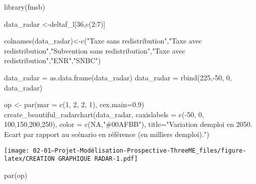 \documentclass[
]{article}
\newenvironment{Shaded}{\begin{snugshade}}{\end{snugshade}}
\newcommand{\AttributeTok}[1]{\textcolor[rgb]{0.77,0.63,0.00}{#1}}
\newcommand{\ConstantTok}[1]{\textcolor[rgb]{0.00,0.00,0.00}{#1}}
\newcommand{\DecValTok}[1]{\textcolor[rgb]{0.00,0.00,0.81}{#1}}
\newcommand{\FloatTok}[1]{\textcolor[rgb]{0.00,0.00,0.81}{#1}}
\newcommand{\FunctionTok}[1]{\textcolor[rgb]{0.00,0.00,0.00}{#1}}
\newcommand{\NormalTok}[1]{#1}
\newcommand{\OtherTok}[1]{\textcolor[rgb]{0.56,0.35,0.01}{#1}}
\newcommand{\SpecialCharTok}[1]{\textcolor[rgb]{0.00,0.00,0.00}{#1}}
\newcommand{\StringTok}[1]{\textcolor[rgb]{0.31,0.60,0.02}{#1}}
\begin{document}
\begin{Shaded}
\begin{Highlighting}[]
\FunctionTok{library}\NormalTok{(fmsb)}


\NormalTok{data\_radar }\OtherTok{\textless{}{-}}\NormalTok{deltaf\_l[}\DecValTok{36}\NormalTok{,}\FunctionTok{c}\NormalTok{(}\DecValTok{2}\SpecialCharTok{:}\DecValTok{7}\NormalTok{)]}



\FunctionTok{colnames}\NormalTok{(data\_radar)}\OtherTok{\textless{}{-}}\FunctionTok{c}\NormalTok{(}\StringTok{"Taxe sans redistribution"}\NormalTok{,}\StringTok{"Taxe avec redistribution"}\NormalTok{,}\StringTok{"Subvention sans redistribution"}\NormalTok{,}\StringTok{"Taxe avec redistribution"}\NormalTok{,}\StringTok{"ENR"}\NormalTok{,}\StringTok{"SNBC"}\NormalTok{)}

\NormalTok{data\_radar  }\OtherTok{=} \FunctionTok{as.data.frame}\NormalTok{(data\_radar)}
\NormalTok{data\_radar  }\OtherTok{=} \FunctionTok{rbind}\NormalTok{(}\DecValTok{225}\NormalTok{,}\SpecialCharTok{{-}}\DecValTok{50}\NormalTok{, }\DecValTok{0}\NormalTok{, data\_radar)}





\NormalTok{op }\OtherTok{\textless{}{-}} \FunctionTok{par}\NormalTok{(}\AttributeTok{mar =} \FunctionTok{c}\NormalTok{(}\DecValTok{1}\NormalTok{, }\DecValTok{2}\NormalTok{, }\DecValTok{2}\NormalTok{, }\DecValTok{1}\NormalTok{), }\AttributeTok{cex.main=}\FloatTok{0.9}\NormalTok{)}
\FunctionTok{create\_beautiful\_radarchart}\NormalTok{(data\_radar, }\AttributeTok{caxislabels =} \FunctionTok{c}\NormalTok{(}\SpecialCharTok{{-}}\DecValTok{50}\NormalTok{, }\DecValTok{0}\NormalTok{, }\DecValTok{100}\NormalTok{,}\DecValTok{150}\NormalTok{,}\DecValTok{200}\NormalTok{,}\DecValTok{250}\NormalTok{), }\AttributeTok{color =} \FunctionTok{c}\NormalTok{(}\ConstantTok{NA}\NormalTok{,}\StringTok{"\#00AFBB"}\NormalTok{), }\AttributeTok{title=}\StringTok{"Variation d\textquotesingle{}emploi en 2050. }
\StringTok{Ecart par rapport au scénario en référence (en milliers d\textquotesingle{}emploi)."}\NormalTok{)}
\end{Highlighting}
\end{Shaded}

\texttt{[image: 02-01---Projet-Modélisation-Prospective-ThreeME\_files/figure-latex/CREATION GRAPHIQUE RADAR-1.pdf]}

\begin{Shaded}
\begin{Highlighting}[]
\FunctionTok{par}\NormalTok{(op)}
\end{Highlighting}
\end{Shaded}
\end{document}
